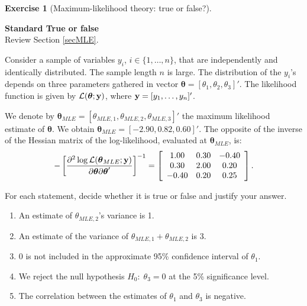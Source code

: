 \documentclass[
  11pt,
]{book}
\theoremstyle{definition}
\theoremstyle{definition}
\theoremstyle{definition}
\newtheorem{exercise}{Exercise}[chapter]
\theoremstyle{definition}
\theoremstyle{remark}
\begin{document}

\begin{exercisebox}

\begin{exercise}[Maximum-likelihood theory: true or false?]
\protect\hypertarget{exr:estimation-mle-true-false}{}\label{exr:estimation-mle-true-false}

\textbf{Standard \textbar{} True or false}\\
Review Section \ref{secMLE}.

Consider a sample of variables \(y_i\), \(i \in \{1,\dots,n\}\), that are independently and identically distributed. The sample length \(n\) is large. The distribution of the \(y_i\)'s depends on three parameters gathered in vector \(\boldsymbol\theta=[\theta_1,\theta_2,\theta_3]'\). The likelihood function is given by \(\mathcal{L}(\boldsymbol\theta;{\bf y})\), where \({\bf y}=[y_1,\dots,y_n]'\).

We denote by \(\boldsymbol\theta_{MLE}=[\theta_{MLE,1},\theta_{MLE,2},\theta_{MLE,3}]'\) the maximum likelihood estimate of \(\boldsymbol\theta\). We obtain \(\boldsymbol\theta_{MLE} = [-2.90,0.82,0.60]'\). The opposite of the inverse of the Hessian matrix of the log-likelihood, evaluated at \(\boldsymbol\theta_{MLE}\), is: \[-\left[\frac{\partial^2\log \mathcal{L}(\boldsymbol\theta_{MLE};{\bf y})}{\partial \boldsymbol\theta \partial \boldsymbol\theta'}\right]^{-1} =
\left[
\begin{array}{ccc}
1.00   &  0.30 & -0.40\\
0.30   & 2.00  & 0.20\\
-0.40  & 0.20  & 0.25
\end{array}
\right].\]

For each statement, decide whether it is true or false and justify your answer.

\begin{enumerate}
\def\labelenumi{\arabic{enumi}.}
\item
  An estimate of \(\theta_{MLE,2}\)'s variance is 1.
\item
  An estimate of the variance of \(\theta_{MLE,1}+\theta_{MLE,2}\) is 3.
\item
  \(0\) is not included in the approximate 95\% confidence interval of \(\theta_1\).
\item
  We reject the null hypothesis \(H_0:\;\theta_3=0\) at the 5\% significance level.
\item
  The correlation between the estimates of \(\theta_1\) and \(\theta_3\) is negative.
\end{enumerate}

\end{exercise}

\end{exercisebox}
\end{document}
